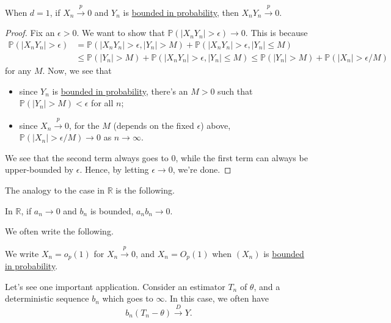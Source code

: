 \begin{proposition}
	When \(d = 1\), if \(X_n \overset{p}{\to } 0\) and \(Y_n\) is \hyperref[def:bounded-in-probability]{bounded in probability}, then \(X_n Y_n \overset{p}{\to } 0\).
\end{proposition}
\begin{proof}
	Fix an \(\epsilon > 0\). We want to show that \(\mathbb{P} (\vert X_n Y_n \vert > \epsilon ) \to 0\). This is because
	\[
		\begin{split}
			\mathbb{P} (\vert X_n Y_n \vert > \epsilon )
			 & = \mathbb{P} (\vert X_n Y_n \vert > \epsilon , \vert Y_n \vert > M) + \mathbb{P} (\vert X_n Y_n \vert > \epsilon , \vert Y_n \vert \leq M) \\
			 & \leq \mathbb{P} (\vert Y_n \vert > M) + \mathbb{P} (\vert X_n Y_n \vert > \epsilon , \vert Y_n \vert \leq M)
			\leq \mathbb{P} (\vert Y_n \vert > M ) + \mathbb{P} (\vert X_n \vert > \epsilon / M)
		\end{split}
	\]
	for any \(M\). Now, we see that
	\begin{itemize}
		\item since \(Y_n\) is \hyperref[def:bounded-in-probability]{bounded in probability}, there's an \(M > 0\) such that \(\mathbb{P} (\vert Y_n \vert > M) < \epsilon \) for all \(n\);
		\item since \(X_n \overset{p}{\to } 0\), for the \(M\) (depends on the fixed \(\epsilon \)) above, \(\mathbb{P} (\vert X_n \vert > \epsilon / M) \to 0\) as \(n \to \infty \).
	\end{itemize}
	We see that the second term always goes to \(0\), while the first term can always be upper-bounded by \(\epsilon \). Hence, by letting \(\epsilon \to 0\), we're done.
\end{proof}

The analogy to the case in \(\mathbb{R} \) is the following.

\begin{intuition}
	In \(\mathbb{R} \), if \(a_n \to 0\) and \(b_n\) is bounded, \(a_n b_n \to 0\).
\end{intuition}

We often write the following.

\begin{notation}
	We write \(X_n = o_p(1)\) for \(X_n \overset{p}{\to } 0\), and \(X_n = O_p(1)\) when \((X_n)\) is \hyperref[def:bounded-in-probability]{bounded in probability}.
\end{notation}

Let's see one important application. Consider an estimator \(T_n\) of \(\theta \), and a deterministic sequence \(b_n\) which goes to \(\infty \). In this case, we often have
\[
	b_n (T_n - \theta ) \overset{D}{\to } Y.
\]

